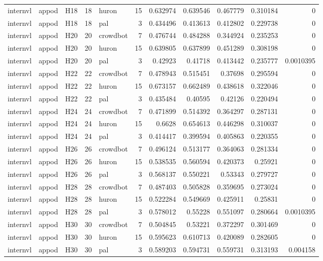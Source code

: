 \begin{longtable}{lllrlrrrrrr}
internvl & appod & H18 & 18 & huron & 15 & 0.632974 & 0.639546 & 0.467779 & 0.310184 & 0 \\
internvl & appod & H18 & 18 & pal & 3 & 0.434496 & 0.413613 & 0.412802 & 0.229738 & 0 \\
internvl & appod & H20 & 20 & crowdbot & 7 & 0.476744 & 0.484288 & 0.344924 & 0.235253 & 0 \\
internvl & appod & H20 & 20 & huron & 15 & 0.639805 & 0.637899 & 0.451289 & 0.308198 & 0 \\
internvl & appod & H20 & 20 & pal & 3 & 0.42923 & 0.41718 & 0.413442 & 0.235777 & 0.0010395 \\
internvl & appod & H22 & 22 & crowdbot & 7 & 0.478943 & 0.515451 & 0.37698 & 0.295594 & 0 \\
internvl & appod & H22 & 22 & huron & 15 & 0.673157 & 0.662489 & 0.438618 & 0.322046 & 0 \\
internvl & appod & H22 & 22 & pal & 3 & 0.435484 & 0.40595 & 0.42126 & 0.220494 & 0 \\
internvl & appod & H24 & 24 & crowdbot & 7 & 0.471899 & 0.514392 & 0.364297 & 0.287131 & 0 \\
internvl & appod & H24 & 24 & huron & 15 & 0.6628 & 0.654613 & 0.446298 & 0.310037 & 0 \\
internvl & appod & H24 & 24 & pal & 3 & 0.414417 & 0.399594 & 0.405863 & 0.220355 & 0 \\
internvl & appod & H26 & 26 & crowdbot & 7 & 0.496124 & 0.513177 & 0.364063 & 0.281334 & 0 \\
internvl & appod & H26 & 26 & huron & 15 & 0.538535 & 0.560594 & 0.420373 & 0.25921 & 0 \\
internvl & appod & H26 & 26 & pal & 3 & 0.568137 & 0.550221 & 0.53343 & 0.279727 & 0 \\
internvl & appod & H28 & 28 & crowdbot & 7 & 0.487403 & 0.505828 & 0.359695 & 0.273024 & 0 \\
internvl & appod & H28 & 28 & huron & 15 & 0.522284 & 0.549669 & 0.425911 & 0.25831 & 0 \\
internvl & appod & H28 & 28 & pal & 3 & 0.578012 & 0.55228 & 0.551097 & 0.280664 & 0.0010395 \\
internvl & appod & H30 & 30 & crowdbot & 7 & 0.504845 & 0.53221 & 0.372297 & 0.301469 & 0 \\
internvl & appod & H30 & 30 & huron & 15 & 0.595623 & 0.610713 & 0.420089 & 0.282605 & 0 \\
internvl & appod & H30 & 30 & pal & 3 & 0.589203 & 0.594731 & 0.559731 & 0.313193 & 0.004158 \\

\end{longtable}

